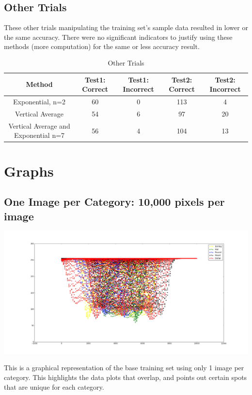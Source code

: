 \documentclass{article}
\begin{document}
 \subsection{Other Trials}
 These other trials manipulating the training set's sample data resulted in lower or the same accuracy. There were no significant indicators to justify using these methods (more computation) for the same or less accuracy result.
 \begin{table}[h]
 	\centering
 	\caption{Other Trials}
 	\label{tab:table2}
 	\begin{tabular}{|c|c|c|c|c|}
 		\hline
 		Method & Test1: Correct & Test1: Incorrect & Test2: Correct & Test2: Incorrect \\
 		\hline
 		Exponential, n=2 & 60 & 0 & 113 & 4 \\
 		\hline
 		Vertical Average & 54 & 6 & 97 & 20 \\
 		\hline
 		Vertical Average and Exponential n=7 & 56 & 4 & 104 & 13 \\
 		\hline
 	\end{tabular}
 \end{table}
  \newpage
  
 \section{Graphs}
 
 \subsection{One Image per Category: 10,000 pixels per image}
 \includegraphics[width=1.1\textwidth]{figure_1.png}
 
 This is a graphical representation of the base training set using only 1 image per category. This highlights the data plots that overlap, and points out certain spots that are unique for each category.
\end{document}
